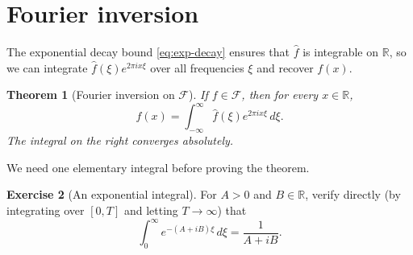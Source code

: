 \documentclass[11pt]{article}
\theoremstyle{plain}
\newtheorem{theorem}{Theorem}[section]
\theoremstyle{definition}
\newtheorem{exercise}[theorem]{Exercise}
\theoremstyle{boldremark}
\theoremstyle{remark}
\numberwithin{equation}{section}
\newcommand{\R}{\mathbb{R}}
\begin{document}
\section{Fourier inversion}

The exponential decay bound \eqref{eq:exp-decay} ensures that $\widehat f$
is integrable on $\R$, so we can integrate $\widehat f(\xi)e^{2\pi i x\xi}$
over all frequencies $\xi$ and recover $f(x)$.

\begin{theorem}[Fourier inversion on $\mathcal F$]\label{thm:fourier-inversion}
If $f\in\mathcal F$, then for every $x\in\R$,
\begin{equation}\label{eq:fourier-inversion}
 \boxed{\displaystyle
  f(x)=\int_{-\infty}^{\infty}\widehat f(\xi)e^{2\pi ix\xi}\,d\xi.}
\end{equation}
The integral on the right converges absolutely.
\end{theorem}

We need one elementary integral before proving the theorem.

\begin{exercise}[An exponential integral]\label{ex:exp-integral}
For $A>0$ and $B\in\R$, verify directly (by integrating over $[0,T]$ and
letting $T\to\infty$) that
\[
 \int_0^\infty e^{-(A+iB)\xi}\,d\xi = \frac{1}{A+iB}.
\]
\end{exercise}
\end{document}
